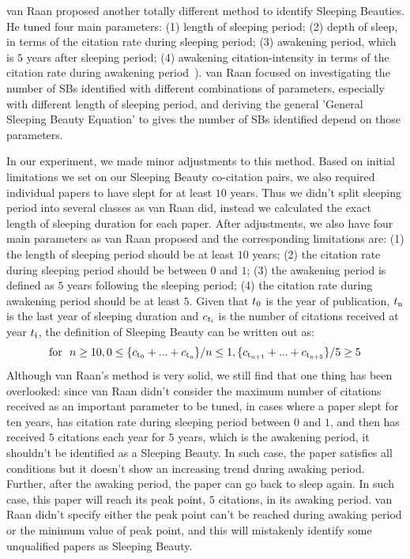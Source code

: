 \documentclass[utf8]{frontiersSCNS}
\begin{document}
{van Raan proposed another totally different method to identify Sleeping Beauties. He tuned four main parameters: (1) length of sleeping period; (2) depth of sleep, in terms of the citation rate during sleeping period; (3) awakening period, which is $5$ years after sleeping period; (4) awakening citation-intensity in terms of the citation rate during awakening period~\citep{Raan2019}). van Raan focused on investigating the number of SBs identified with different combinations of parameters, especially with different length of sleeping period, and deriving the general 'General Sleeping Beauty Equation' to gives the number of SBs identified depend on those parameters. 

In our experiment, we made minor adjustments to this method. Based on initial limitations we set on our Sleeping Beauty co-citation pairs, we also required individual papers to have slept for at least $10$ years. Thus we didn't split sleeping period into several classes as van Raan did, instead we calculated the exact length of sleeping duration for each paper. After adjustments, we also have four main parameters as van Raan proposed and the corresponding limitations are: (1) the length of sleeping period should be at least $10$ years; (2) the citation rate during sleeping period should be between $0$ and $1$; (3) the awakening period is defined as $5$ years following the sleeping period; (4) the citation rate during awakening period should be at least $5$. Given that $t\textsubscript{0}$ is the year of publication, $t\textsubscript{n}$ is the last year of sleeping duration and $c\textsubscript{$t\textsubscript{i}$}$ is the number of citations received at year $t\textsubscript{i}$, the definition of Sleeping Beauty can be written out as:
\begin{equation}
\text{for }\ n \geq 10, 0 \leq \{c\textsubscript{t\textsubscript{0}} + ... + c\textsubscript{t\textsubscript{n}}\}/n \leq 1, \{c\textsubscript{t\textsubscript{n+1}} + ... + c\textsubscript{t\textsubscript{n+5}}\}/5 \geq 5
\end{equation}
Although van Raan's method is very solid, we still find that one thing has been overlooked: since van Raan didn't consider the maximum number of citations received as an important parameter to be tuned, in cases where a paper slept for ten years, has citation rate during sleeping period between $0$ and $1$, and then has received $5$ citations each year for $5$ years, which is the awakening period, it shouldn't be identified as a Sleeping Beauty. In such case, the paper satisfies all conditions but it doesn't show an increasing trend during awaking period. Further, after the awaking period, the paper can go back to sleep again. In such case, this paper will reach its peak point, $5$ citations, in its awaking period. van Raan didn't specify either the peak point can't be reached during awaking period or the minimum value of peak point, and this will mistakenly identify some unqualified papers as Sleeping Beauty.

}
\end{document}
